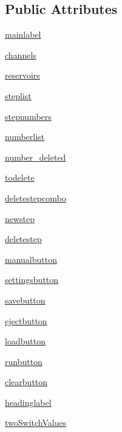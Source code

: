 \subsection*{Public Attributes}
\begin{DoxyCompactItemize}
\item 
\mbox{\hyperlink{class_g_u_i_1_1_automatic_page_a031a4cc5e4dd615283c4c7614423a30c}{mainlabel}}
\item 
\mbox{\hyperlink{class_g_u_i_1_1_automatic_page_aa8288b58ed4106b306f856ab38b68492}{channels}}
\item 
\mbox{\hyperlink{class_g_u_i_1_1_automatic_page_ae266da43d4b654f697f62b46e34fa8c0}{reservoirs}}
\item 
\mbox{\hyperlink{class_g_u_i_1_1_automatic_page_a09b2a20e8203753f1bc64924af04a0fb}{steplist}}
\item 
\mbox{\hyperlink{class_g_u_i_1_1_automatic_page_a871d9b1cfc8f2ba61defb2bfdc93cf78}{stepnumbers}}
\item 
\mbox{\hyperlink{class_g_u_i_1_1_automatic_page_aa0a9e5674ac9f72ee28583e47bdc7e98}{numberlist}}
\item 
\mbox{\hyperlink{class_g_u_i_1_1_automatic_page_a88c9bd3cae3ed5df9e15741ddafc1b9f}{number\+\_\+deleted}}
\item 
\mbox{\hyperlink{class_g_u_i_1_1_automatic_page_a74570f9298c69cb60f81e4caf616e37a}{todelete}}
\item 
\mbox{\hyperlink{class_g_u_i_1_1_automatic_page_ab85f1d1f3ec4683c451fe7fc17c6f505}{deletestepcombo}}
\item 
\mbox{\hyperlink{class_g_u_i_1_1_automatic_page_a4b73aabc00a5e160038d678bdccecb5f}{newstep}}
\item 
\mbox{\hyperlink{class_g_u_i_1_1_automatic_page_acc20273f8fd92babaf57d29c2b0991b2}{deletestep}}
\item 
\mbox{\hyperlink{class_g_u_i_1_1_automatic_page_aff952e2bcc5816103234663ff5da64e4}{manualbutton}}
\item 
\mbox{\hyperlink{class_g_u_i_1_1_automatic_page_ad59c8360368b61cf90f5a54bdaddb50a}{settingsbutton}}
\item 
\mbox{\hyperlink{class_g_u_i_1_1_automatic_page_a9ee7f4dda48ab61dedd110ea61b2744d}{savebutton}}
\item 
\mbox{\hyperlink{class_g_u_i_1_1_automatic_page_a32f3b0400f864da0c90bbdfaf8e0e390}{ejectbutton}}
\item 
\mbox{\hyperlink{class_g_u_i_1_1_automatic_page_a3297d85f64a126dba509432342a2bbc9}{loadbutton}}
\item 
\mbox{\hyperlink{class_g_u_i_1_1_automatic_page_a76ba2775f70508457cf1cbf7bdb0266c}{runbutton}}
\item 
\mbox{\hyperlink{class_g_u_i_1_1_automatic_page_a109a256191c222788fd6facb59168a46}{clearbutton}}
\item 
\mbox{\hyperlink{class_g_u_i_1_1_automatic_page_a80516e311ba938b07b48efc49cb04b44}{headinglabel}}
\item 
\mbox{\hyperlink{class_g_u_i_1_1_automatic_page_a1f890c197f0c5fbb621bc850eff774ca}{two\+Switch\+Values}}
\end{DoxyCompactItemize}


